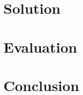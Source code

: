 \documentclass[letterpaper,12pt,titlepage,oneside,final]{book}
\let\origdoublepage\cleardoublepage
\newcommand{\clearemptydoublepage}{%
  \clearpage{\pagestyle{empty}\origdoublepage}}
\let\cleardoublepage\clearemptydoublepage
\begin{document}
\chapter{Solution}



\chapter{Evaluation}



\chapter{Conclusion}






\cleardoublepage %
\renewcommand*{\bibname}{References}



\end{document}
